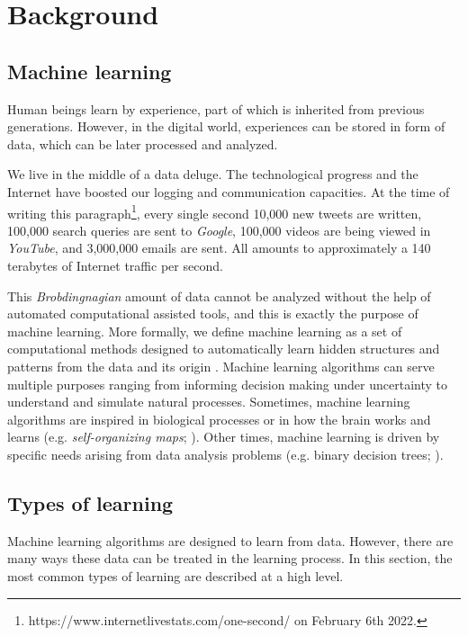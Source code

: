 \chapter{Background} \label{ch:background}
\section{Machine learning}
Human beings learn by experience, part of which is inherited from previous generations. However, in the digital world, experiences can be stored in form of data, which can be later processed and analyzed.

We live in the middle of a data deluge. The technological progress and the Internet have boosted our logging and communication capacities. At the time of writing this paragraph\footnote{https://www.internetlivestats.com/one-second/ on February 6th 2022.}, every single second 10,000 new tweets are written, 100,000 search queries are sent to \textit{Google}, 100,000 videos are being viewed in \textit{YouTube}, and 3,000,000 emails are sent. All amounts to approximately a 140 terabytes of Internet traffic per second.

This \textit{Brobdingnagian} amount of data cannot be analyzed without the help of automated computational assisted tools, and this is exactly the purpose of machine learning. More formally, we define machine learning as a set of computational methods designed to automatically learn hidden structures and patterns from the data and its origin \autocite{murphy2012, theodoridis2015}. Machine learning algorithms can serve multiple purposes ranging from informing decision making under uncertainty to understand and simulate natural processes. Sometimes, machine learning algorithms are inspired in biological processes \autocite{haykin1998} or in how the brain works and learns (e.g. \textit{self-organizing maps}; \citealp{kohonen2001}). Other times, machine learning is driven by specific needs arising from data analysis problems (e.g. binary decision trees; \citealp{hastie2009, hastie2014}).

\section{Types of learning}
Machine learning algorithms are designed to learn from data. However, there are many ways these data can be treated in the learning process. In this section, the most common types of learning are described at a high level.

